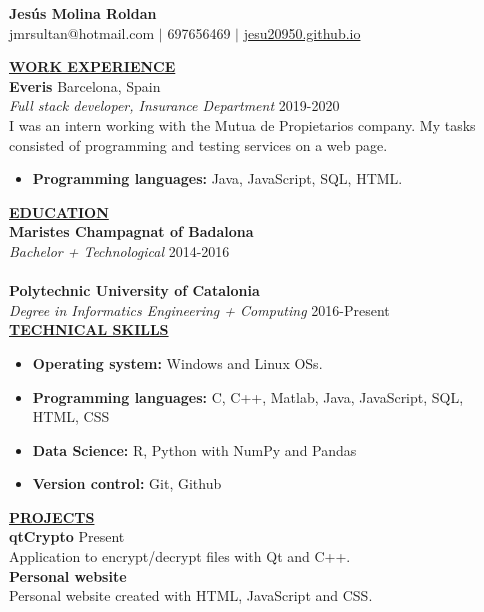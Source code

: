 \documentclass{article}
\begin{document}
	\begin{center}
		\thispagestyle{empty}
		\large \textbf{Jesús Molina Roldan\\}
		\normalsize jmr\textunderscore sultan@hotmail.com $\mid$ 697656469 $\mid$ \href{https://jesu20950.github.io/}{jesu20950.github.io} \\ 
		\hrulefill
	\end{center}
	
	\noindent \textbf{\underline{WORK EXPERIENCE}} \\
	\noindent \textbf{Everis} \hfill Barcelona, Spain \\
	\textit{Full stack developer, Insurance Department} \hfill 2019-2020 \\
	I was an intern working with the Mutua de Propietarios company. My tasks consisted of programming and testing services on a web page.
	\begin{itemize}[noitemsep,nolistsep,leftmargin=*]
		\item {\textbf{Programming languages:} Java, JavaScript, SQL, HTML.}\\
	\end{itemize}
	

	\noindent \textbf{\underline{EDUCATION}} \\
	\textbf{Maristes Champagnat of Badalona} \\
	\textit{Bachelor + Technological}  \hfill 2014-2016  \\ \\
	\textbf{Polytechnic University of Catalonia} \\
	\textit{Degree in Informatics Engineering + Computing}  \hfill 2016-Present \\
	

	\noindent \textbf{\underline{TECHNICAL SKILLS}} \\
	\begin{itemize}[noitemsep,nolistsep,leftmargin=*]
		\item {\textbf{Operating system:} Windows and Linux OSs.}
		\item {\textbf{Programming languages:} C, C++, Matlab, Java, JavaScript, SQL, HTML, CSS}
		\item {\textbf{Data Science:} R, Python with NumPy and Pandas}
		\item {\textbf{Version control:} Git, Github}\\
	\end{itemize}
	
		\noindent \textbf{\underline{PROJECTS}} \\
	\noindent \textbf{qtCrypto}  \hfill  Present \\
	Application to encrypt/decrypt files with Qt and C++. \\
	\noindent \textbf{Personal website}  \\
	Personal website created with HTML, JavaScript and CSS. \\
	
\end{document}
